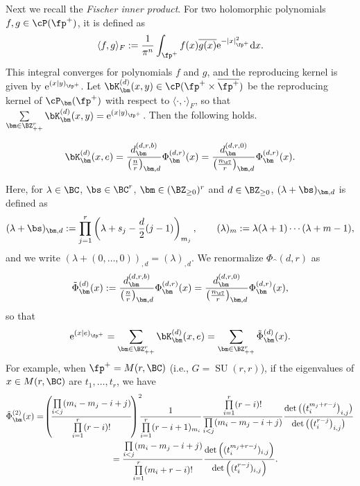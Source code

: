 Next we recall the \textit{Fischer inner product}.
For two holomorphic polynomials $f,g\in\cP(\fp^+)$, it is defined as
\begin{gather}\label{Fischer}
\langle f,g\rangle_F:=\frac{1}{\pi^n}\int_{\fp^+}f(x)\overline{g(x)} {\rm e}^{-|x|_{\fp^+}^2}{\rm d}x.
\end{gather}
This integral converges for polynomials $f$ and $g$, and the reproducing kernel is given by ${\rm e}^{(x|y)_{\fp^+}}$.
Let $\bK_\bm^{(d)}(x,y)\in\cP(\fp^+\times\overline{\fp^+})$ be the reproducing kernel of $\cP_\bm(\fp^+)$
with respect to $\langle\cdot,\cdot\rangle_F$, so that $\sum\limits_{\bm\in\BZ_{++}^r}\bK_\bm^{(d)}(x,y)={\rm e}^{(x|y)_{\fp^+}}$. Then the following holds.
\begin{Proposition}\label{Kmxe}
\begin{gather*} \bK_\bm^{(d)}(x,e)=\frac{d_\bm^{(d,r,b)}}{\left(\frac{n}{r}\right)_{\bm,d}}\Phi_\bm^{(d,r)}(x)
=\frac{d_\bm^{(d,r,0)}}{\left(\frac{n_\rT}{r}\right)_{\bm,d}}\Phi_\bm^{(d,r)}(x). \end{gather*}
\end{Proposition}
Here, for $\lambda\in\BC$, $\bs\in\BC^r$, $\bm\in(\BZ_{\ge 0})^r$ and $d\in\BZ_{\ge 0}$, $(\lambda+\bs)_{\bm,d}$ is defined as
\begin{gather}\label{Pochhammer}
(\lambda+\bs)_{\bm,d}:=\prod_{j=1}^r\left(\lambda+s_j-\frac{d}{2}(j-1)\right)_{m_j},\qquad
(\lambda)_m:=\lambda(\lambda+1)\cdots(\lambda+m-1),
\end{gather}
and we write $(\lambda+(0,\ldots,0))_{\bm,d}=(\lambda)_{\bm,d}$.
We renormalize $\Phi_\bm^{(d,r)}$ as
\begin{gather}\label{Phitilde1}
\tilde{\Phi}_\bm^{(d)}(x):=\frac{d_\bm^{(d,r,b)}}{\left(\frac{n}{r}\right)_{\bm,d}}\Phi_\bm^{(d,r)}(x)
=\frac{d_\bm^{(d,r,0)}}{\left(\frac{n_\rT}{r}\right)_{\bm,d}}\Phi_\bm^{(d,r)}(x),
\end{gather}
so that
\begin{gather*} {\rm e}^{(x|e)_{\fp^+}}=\sum_{\bm\in\BZ_{++}^r}\bK_\bm^{(d)}(x,e)=\sum_{\bm\in\BZ_{++}^r}\tilde{\Phi}_\bm^{(d)}(x). \end{gather*}
For example, when $\fp^+=M(r,\BC)$ (i.e., $G=\operatorname{SU}(r,r)$), if the eigenvalues of $x\in M(r,\BC)$ are $t_1,\ldots,t_r$, we have
\begin{gather}
\tilde{\Phi}_\bm^{(2)}(x) = \!\left(\!\frac{\prod\limits_{i<j}(m_i-m_j-i+j)}{\prod\limits_{i=1}^r (r-i)!}\!\right)^2\!\!\! \frac{1}{\prod\limits_{i=1}^r (r-i+1)_{m_i}}
 \frac{\prod\limits_{i=1}^r (r-i)!}{\prod\limits_{i<j}(m_i-m_j-i+j)}
\frac{\det\big(\big(t_i^{m_j+r-j}\big)_{i,j}\big)}{\det\big(\big(t_i^{r-j}\big)_{i,j}\big)}\notag \\
\hphantom{\tilde{\Phi}_\bm^{(2)}(x)}{} =\frac{\prod\limits_{i<j}(m_i-m_j-i+j)}{\prod\limits_{i=1}^r (m_i+r-i)!}
\frac{\det\left((t_i^{m_j+r-j})_{i,j}\right)}{\det\left((t_i^{r-j})_{i,j}\right)}.\label{Schur}
\end{gather}
